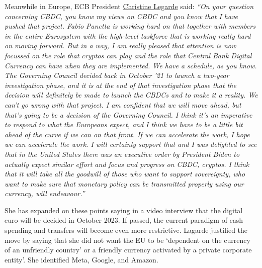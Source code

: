 \begin{itemize}
Meanwhile in Europe, ECB President \href{https://www.ecb.europa.eu/press/pressconf/2022/html/ecb.is220310~1bc8c1b1ca.en.html#qa}{Christine Legarde} said: \textit{``On your question concerning CBDC, you know my views on CBDC and you know that I have pushed that project. Fabio Panetta is working hard on that together with members in the entire Eurosystem with the high-level taskforce that is working really hard on moving forward. But in a way, I am really pleased that attention is now focussed on the role that cryptos can play and the role that Central Bank Digital Currency can have when they are implemented. We have a schedule, as you know. The Governing Council decided back in October '21 to launch a two-year investigation phase, and it is at the end of that investigation phase that the decision will definitely be made to launch the CBDCs and to make it a reality. We can't go wrong with that project. I am confident that we will move ahead, but that's going to be a decision of the Governing Council. I think it's an imperative to respond to what the Europeans expect, and I think we have to be a little bit ahead of the curve if we can on that front. If we can accelerate the work, I hope we can accelerate the work. I will certainly support that and I was delighted to see that in the United States there was an executive order by President Biden to actually expect similar effort and focus and progress on CBDC, cryptos. I think that it will take all the goodwill of those who want to support sovereignty, who want to make sure that monetary policy can be transmitted properly using our currency, will endeavour.''}\par
She has expanded on these points saying in a video interview that the digital euro will be decided in October 2023. If passed, the current paradigm of cash spending and transfers will become even more restrictive. Lagarde justified the move by saying that she did not want the EU to be `dependent on the currency of an unfriendly country' or a friendly currency activated by a private corporate entity'. She identified Meta, Google, and Amazon.\par

\end{itemize}
